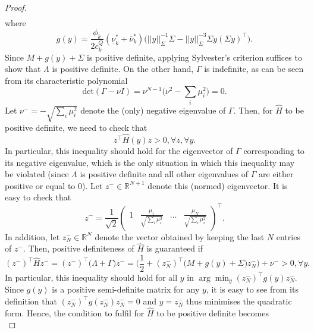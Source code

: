 \documentclass{article}
\begin{document}
\begin{proof}
\begin{align*}
\end{align*} 
where
\begin{equation*}
g(y) = \frac{\phi_k}{2 c_k^Q}(\underline{\nu}_k^* + \overline{\nu}_k^*)\Big(||y||_\Sigma^{-1} \Sigma - ||y||_\Sigma^{-3} \Sigma y(\Sigma y)^\top\Big).
\end{equation*}
Since $M + g(y) + \Sigma$ is positive definite, applying Sylvester's criterion suffices to show that $\Lambda$ is positive definite. On the other hand, $\Gamma$ is indefinite, as can be seen from its characteristic polynomial
\begin{equation*}
\mbox{det}(\Gamma - \nu I) = \nu^{N-1}\Big(\nu^2 - \sum_{i} \mu_i^2 \Big) = 0.
\end{equation*}
Let $\nu^- = -\sqrt{\sum_{i} \mu_i^2}$ denote the (only) negative eigenvalue of $\Gamma$. Then, for $\hat{H}$ to be positive definite, we need to check that
\begin{equation*}
z^\top \hat{H}(y) z > 0, \forall z, \forall y.
\end{equation*}
In particular, this inequality should hold for the eigenvector of $\Gamma$ corresponding to its negative eigenvalue, which is the only situation in which this inequality may be violated (since $\Lambda$ is positive definite and all other eigenvalues of $\Gamma$ are either positive or equal to $0$). Let $z^- \in \mathbb{R}^{N+1}$ denote this (normed) eigenvector. It is easy to check that
\begin{equation*}
z^- = \frac{1}{\sqrt{2}}\begin{pmatrix} 1 & \frac{\mu_1}{\sqrt{\sum_i \mu_i^2}} & \ldots & \frac{\mu_N}{\sqrt{\sum_i \mu_i^2}}\end{pmatrix}^\top.
\end{equation*}
In addition, let $z_N^- \in \mathbb{R}^N$ denote the vector obtained by keeping the last $N$ entries of $z^-$. Then, positive definiteness of $\hat{H}$ is guaranteed if
\begin{equation*}
(z^-)^\top \hat{H} z^- = (z^-)^\top\big(\Lambda + \Gamma\big) z^- = \Big(\frac{1}{2} + (z_N^-)^\top\big(M + g(y) + \Sigma\big)z_N^-\Big) + \nu^- > 0, \forall y.
\end{equation*}
In particular, this inequality should hold for all $y$ in $\arg \min_y (z_N^-)^\top g(y) z_N^-$. Since $g(y)$ is a positive semi-definite matrix for any $y$, it is easy to see from its definition that $(z_N^-)^\top g(z_N^-) z_N^- = 0$ and $y = z_N^-$ thus minimises the quadratic form. Hence, the condition to fulfil for $\hat{H}$ to be positive definite becomes
\begin{equation*}

\end{equation*}
\end{proof}
\end{document}
